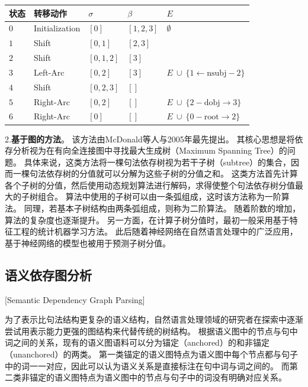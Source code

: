 \begin{table}[thbp]
	\vspace{0.5em}\centering\wuhao
	\begin{tabular}{C{3em}L{7em}R{4.5em}L{4em}L{9em}}
		\toprule[1.5pt]
		状态 & 转移动作 & $\sigma$ & $\beta$ & $E$ \\
		\midrule[1pt]
		$0$ & Initialization & $[0]$ & $[1, 2, 3]$ & $\emptyset $ \\
		$1$ & Shift & $[0, 1]$ & $[2, 3]$ &  \\
		$2$ & Shift & $[0, 1, 2]$ & $[3]$ &  \\
		$3$ & Left-Arc & $[0, 2]$ & $[3]$ & $E\ \cup\ \{1\leftarrow \textrm{nsubj}-2\}$ \\
		$4$ & Shift & $[0, 2, 3]$ & $[]$ &  \\
		$5$ & Right-Arc & $[0, 2]$ & $[]$ & $E\ \cup\ \{2- \textrm{dobj}\rightarrow3\}$ \\
        $6$ & Right-Arc & $[0]$ & $[]$ & $E\ \cup\ \{0- \textrm{root}\rightarrow2\}$ \\
		\bottomrule[1.5pt]
	\end{tabular}
\end{table}

2.\textbf{基于图的方法}。
该方法由McDonald等人\cite{mcdonald-etal-2005-online}与2005年最先提出。
其核心思想是将依存分析视为在有向全连接图中寻找最大生成树（Maximum Spanning Tree）的问题。
具体来说，这类方法将一棵句法依存树视为若干子树（subtree）的集合，因而一棵句法依存树的分值就可以分解为这些子树的分值之和。
这类方法首先计算各个子树的分值，然后使用动态规划算法进行解码，求得使整个句法依存树分值最大的子树组合。
算法中使用的子树可以由一条弧组成，这时该方法称为一阶算法。
同理，若基本子树结构由两条弧组成，则称为二阶算法。\cite{carreras-2007-experiments}
随着阶数的增加，算法的复杂度也逐渐提升。
另一方面，在计算子树分值时，最初一般采用基于特征工程的统计机器学习方法。
此后随着神经网络在自然语言处理中的广泛应用，基于神经网络的模型也被用于预测子树分值。

\subsection{语义依存图分析}[Semantic Dependency Graph Parsing]
\label{sec:sdp}

为了表示比句法结构更复杂的语义结构，自然语言处理领域的研究者在探索中逐渐尝试用表示能力更强的图结构来代替传统的树结构。
根据语义图中的节点与句中词之间的关系，现有的语义图语料可以分为锚定（anchored）的和非锚定（unanchored）的两类。
第一类锚定的语义图特点为语义图中每个节点都与句子中的词一一对应，因此可以认为语义关系是直接标注在句中词与词之间的。
而第二类非锚定的语义图特点为语义图中的节点与句子中的词没有明确对应关系。

